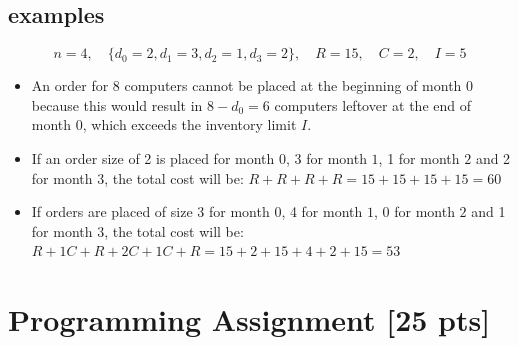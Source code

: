 \documentclass{article}
\let\oldnl\nl%
\newcommand\nonl{%
  \renewcommand{\nl}{\let\nl\oldnl}}%
\begin{document}
%
%
%
%

\subsection{examples}
 $$n=4, \quad \{d_{0} = 2 , d_{1} = 3, d_{2} = 1,d_{3} = 2 \}, \quad R=15,\quad C=2,\quad I=5$$
 \begin{itemize}
     \item  An order for 8 computers cannot be placed at the beginning of month $0$ because this would result in $8-d_{0}=6$ computers leftover at the end of month 0, which exceeds the inventory limit $I$.
     \item If an order size of 2 is placed for month $0$, 3 for month $1$, 1 for month $2$ and 2 for month $3$, the total cost will be: $R+R+R+R = 15+15+15+15=60$
     \item If orders are placed of size 3 for month $0$, 4 for month $1$, 0 for month $2$ and 1 for month $3$, the total cost will be: $R + 1C + R + 2C + 1C + R = 15 + 2 + 15 + 4 + 2 + 15=53$
 \end{itemize}


\section{Programming Assignment [25 pts]}
\end{document}
